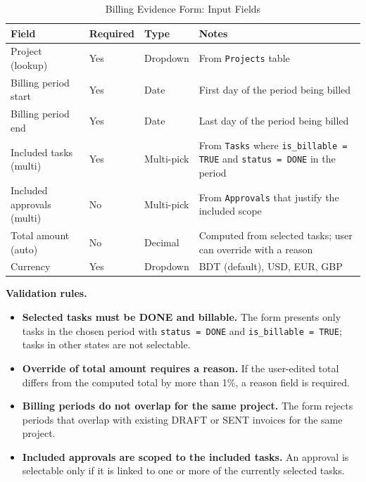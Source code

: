 \documentclass[12pt,a4paper]{report}
\begin{document}
\begin{table}[H]
\centering
\caption{Billing Evidence Form: Input Fields}
\small
\renewcommand{\arraystretch}{1.30}
\setlength{\tabcolsep}{6pt}
\begin{tabularx}{\textwidth}{>{\raggedright\arraybackslash}p{3.6cm}
                                >{\raggedright\arraybackslash}p{1.6cm}
                                >{\raggedright\arraybackslash}p{2.4cm}
                                >{\raggedright\arraybackslash}X}
\toprule
\textbf{Field} & \textbf{Required} & \textbf{Type} & \textbf{Notes} \\
\midrule
Project (lookup)            & Yes & Dropdown    & From \texttt{Projects} table \\
Billing period start        & Yes & Date        & First day of the period being billed \\
Billing period end          & Yes & Date        & Last day of the period being billed \\
Included tasks (multi)      & Yes & Multi-pick  & From \texttt{Tasks} where \texttt{is\_billable = TRUE} and \texttt{status = DONE} in the period \\
Included approvals (multi)  & No  & Multi-pick  & From \texttt{Approvals} that justify the included scope \\
Total amount (auto)         & No  & Decimal     & Computed from selected tasks; user can override with a reason \\
Currency                    & Yes & Dropdown    & BDT (default), USD, EUR, GBP \\
\bottomrule
\end{tabularx}
\end{table}

\textbf{Validation rules.}
\begin{itemize}[leftmargin=1.6em]
    \item \textbf{Selected tasks must be DONE and billable.} The form
          presents only tasks in the chosen period with
          \texttt{status = DONE} and \texttt{is\_billable = TRUE}; tasks in
          other states are not selectable.
    \item \textbf{Override of total amount requires a reason.} If the
          user-edited total differs from the computed total by more than
          1\%, a reason field is required.
    \item \textbf{Billing periods do not overlap for the same project.} The
          form rejects periods that overlap with existing DRAFT or SENT
          invoices for the same project.
    \item \textbf{Included approvals are scoped to the included tasks.} An
          approval is selectable only if it is linked to one or more of
          the currently selected tasks.
\end{itemize}
\end{document}

